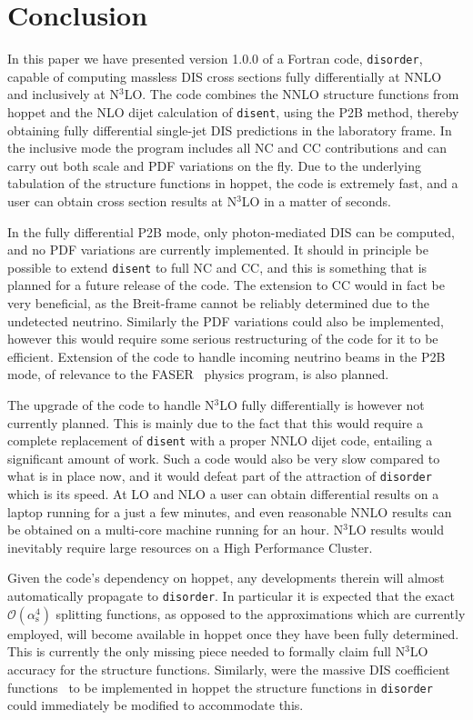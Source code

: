 \documentclass[submission, PhysCodeb]{SciPost_better_arXiv}
\newcommand{\hoppet}{{\sc hoppet}}
\newcommand{\disent}{{\tt disent}}
\newcommand{\disorder}{{\tt disorder}}
\newcommand{\as}{\alpha_{\mathrm{s}}}
\newcommand{\NNNLO}{N$^3$LO}
\begin{document}
\section{Conclusion}
\label{sec:conclusion}
In this paper we have presented version 1.0.0 of a Fortran code,
\disorder{}, capable of computing massless DIS cross sections fully
differentially at NNLO and inclusively at \NNNLO{}. The code combines
the NNLO structure functions from \hoppet{} and the NLO dijet
calculation of \disent{}, using the P2B method, thereby obtaining
fully differential single-jet DIS predictions in the laboratory
frame. In the inclusive mode the program includes all NC and CC
contributions and can carry out both scale and PDF variations on the
fly. Due to the underlying tabulation of the structure functions in
\hoppet{}, the code is extremely fast, and a user can obtain cross
section results at \NNNLO{} in a matter of seconds.

In the fully differential P2B mode, only photon-mediated DIS can be
computed, and no PDF variations are currently implemented. It should
in principle be possible to extend \disent{} to full NC and CC, and
this is something that is planned for a future release of the
code. The extension to CC would in fact be very beneficial, as the
Breit-frame cannot be reliably determined due to the undetected
neutrino. Similarly the PDF variations could also be implemented,
however this would require some serious restructuring of the code for
it to be efficient. Extension of the code to handle incoming neutrino
beams in the P2B mode, of relevance to the FASER~\cite{Feng:2017uoz}
physics program, is also planned.

The upgrade of the code to handle \NNNLO{} fully differentially is
however not currently planned. This is mainly due to the fact that
this would require a complete replacement of \disent{} with a proper
NNLO dijet code, entailing a significant amount of
work. Such a code would also be very slow compared to what is in place
now, and it would defeat part of the attraction of \disorder{} which
is its speed. At LO and NLO a user can obtain differential results on
a laptop running for a just a few minutes, and even reasonable NNLO
results can be obtained on a multi-core machine running for an
hour. \NNNLO{} results would inevitably require large resources on a
High Performance Cluster.

Given the code's dependency on \hoppet{}, any developments therein
will almost automatically propagate to \disorder{}. In particular it
is expected that the exact $\mathcal{O}(\as^4)$ splitting functions,
as opposed to the approximations which are currently employed, will
become available in \hoppet{} once they have been fully
determined. This is currently the only missing piece needed to
formally claim full \NNNLO{} accuracy for the structure
functions. Similarly, were the massive DIS coefficient
functions~\cite{Gottschalk:1980rv,Laenen:1992zk,Laenen:1992xs,Gluck:1997sj,Blumlein:2011zu,Behring:2015roa,Berger:2016inr,Gao:2017kkx}
to be implemented in \hoppet{} the structure functions in \disorder{}
could immediately be modified to accommodate this.
\end{document}
